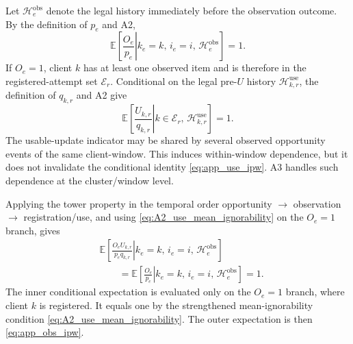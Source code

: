 Let $\mathcal{H}^{\mathrm{obs}}_e$ denote the legal history immediately before
the observation outcome.  By the definition of $p_e$ and A2,
\begin{equation}
    \mathbb{E}
    \left[
    \left.
    \frac{O_e}{p_e}
    \right|
    k_e=k,\,
    i_e=i,\,
    \mathcal{H}^{\mathrm{obs}}_e
    \right]
    =1.
    \label{eq:app_obs_ipw}
\end{equation}
If $O_e=1$, client $k$ has at least one observed item and is therefore in the
registered-attempt set $\mathcal{E}_r$.  Conditional on the legal pre-$U$
history $\mathcal{H}^{\mathrm{use}}_{k,r}$, the definition of $q_{k,r}$ and A2
give
\begin{equation}
    \mathbb{E}
    \left[
    \left.
    \frac{U_{k,r}}{q_{k,r}}
    \right|
    k\in\mathcal{E}_r,\,
    \mathcal{H}^{\mathrm{use}}_{k,r}
    \right]
    =1.
    \label{eq:app_use_ipw}
\end{equation}
The usable-update indicator may be shared by several observed opportunity
events of the same client-window.  This induces within-window dependence, but
it does not invalidate the conditional identity
\eqref{eq:app_use_ipw}.  A3 handles such dependence at the
cluster/window level.

Applying the tower property in the temporal order
opportunity $\rightarrow$ observation $\rightarrow$ registration/use, and using
\eqref{eq:A2_use_mean_ignorability} on the $O_e=1$ branch, gives
\begin{align}
 &\mathbb{E}\!\left[
 \left.
 \frac{O_eU_{k,r}}{p_eq_{k,r}}
 \right|
 k_e=k,\,i_e=i,\,\mathcal{H}^{\mathrm{obs}}_e
 \right]
 \nonumber\\
 &\qquad=
 \mathbb{E}\!\left[
 \left.
 \frac{O_e}{p_e}
 \right|
 k_e=k,\,i_e=i,\,\mathcal{H}^{\mathrm{obs}}_e
 \right]
 =1.
 \label{eq:app_sequential_identity}
\end{align}
The inner conditional expectation is evaluated only on the $O_e=1$ branch,
where client $k$ is registered.  It equals one by the strengthened
mean-ignorability condition \eqref{eq:A2_use_mean_ignorability}.  The outer
expectation is then \eqref{eq:app_obs_ipw}.

